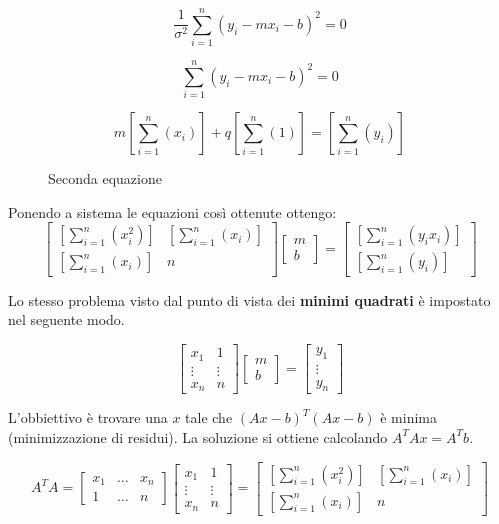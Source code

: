 \documentclass[\main/main.tex]{subfiles}
\begin{document}
\[
	\dfrac{1}{\sigma^2} \sum_{i=1}^n \left(y_i - mx_i - b \right)^2  = 0
\]

\[
	\sum_{i=1}^n \left(y_i - mx_i - b \right)^2 = 0
\]

\begin{figure}[H]
	\[
		m\left [ \sum_{i=1}^n \left(x_i \right) \right ] + q \left [ \sum_{i=1}^n \left(1 \right) \right ] = \left [ \sum_{i=1}^n \left(y_i \right) \right ]
	\]
	\caption{Seconda equazione}
\end{figure}

Ponendo a sistema le equazioni così ottenute ottengo:
\[
	\begin{bmatrix}
		\left [ \sum_{i=1}^n \left(x_i^2 \right) \right ] & \left [ \sum_{i=1}^n \left(x_i \right) \right ] \\
		\left [ \sum_{i=1}^n \left(x_i \right) \right ]   & n
	\end{bmatrix}
	\begin{bmatrix}
		m \\
		b
	\end{bmatrix}
	=
	\begin{bmatrix}
		\left [ \sum_{i=1}^n \left(y_i x_i \right) \right ] \\
		\left [ \sum_{i=1}^n \left(y_i \right) \right ]
	\end{bmatrix}
\]

Lo stesso problema visto dal punto di vista dei \textbf{minimi quadrati} è impostato nel seguente modo.

\[
	\begin{bmatrix}
		x_1    & 1      \\
		\vdots & \vdots \\
		x_n    & n
	\end{bmatrix}
	\begin{bmatrix}
		m \\
		b
	\end{bmatrix}
	=
	\begin{bmatrix}
		y_1    \\
		\vdots \\
		y_n
	\end{bmatrix}
\]

L'obbiettivo è trovare una $x$ tale che $(Ax-b)^T(Ax-b)$ è minima (minimizzazione di residui).
La soluzione si ottiene calcolando $A^TAx = A^Tb$.

\[
	A^TA = \begin{bmatrix}
		x_1 & \dots & x_n \\
		1   & \dots & n
	\end{bmatrix}
	\begin{bmatrix}
		x_1    & 1      \\
		\vdots & \vdots \\
		x_n    & n
	\end{bmatrix}
	=
	\begin{bmatrix}
		\left [ \sum_{i=1}^n \left(x_i^2 \right) \right ] & \left [ \sum_{i=1}^n \left(x_i \right) \right ] \\
		\left [ \sum_{i=1}^n \left(x_i \right) \right ]   & n
	\end{bmatrix}
\]
\end{document}
